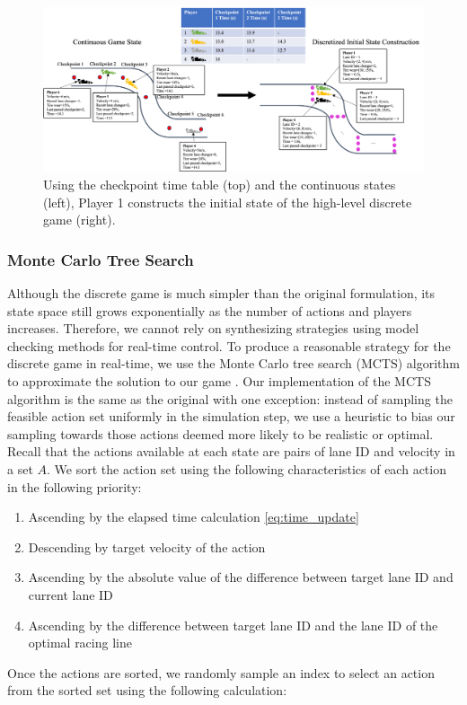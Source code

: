 \begin{figure}
  \centering
    \includegraphics[width=\textwidth]{Figures/DiscreteInitialization.png}
  \caption[High-level planner discrete game initialization]{Using the checkpoint time table (top) and the continuous states (left), Player 1 constructs the initial state of the high-level discrete game (right).}
  \label{fig:disc_construct}
\end{figure}

\subsubsection{Monte Carlo Tree Search}
Although the discrete game is much simpler than the original formulation, its state space still grows exponentially as the number of actions and players increases. Therefore, we cannot rely on synthesizing strategies using model checking methods for real-time control. To produce a reasonable strategy for the discrete game in real-time, we use the Monte Carlo tree search (MCTS) algorithm to approximate the solution to our game \cite{mcts}. Our implementation of the MCTS algorithm is the same as the original with one exception: instead of sampling the feasible action set uniformly in the simulation step, we use a heuristic to bias our sampling towards those actions deemed more likely to be realistic or optimal. Recall that the actions available at each state are pairs of lane ID and velocity in a set $A$. We sort the action set using the following characteristics of each action in the following priority:
\begin{enumerate}
    \item Ascending by the elapsed time calculation \eqref{eq:time_update}
    \item Descending by target velocity of the action
    \item Ascending by the absolute value of the difference between target lane ID and current lane ID
    \item Ascending by the difference between target lane ID and the lane ID of the optimal racing line
\end{enumerate}
Once the actions are sorted, we randomly sample an index to select an action from the sorted set using the following calculation:

